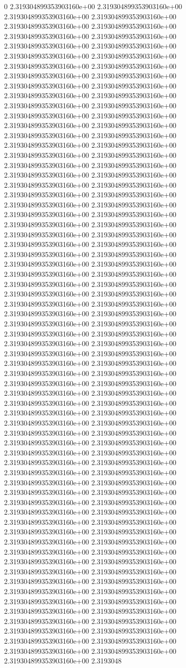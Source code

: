 0	2.319304899353903160e+00	2.319304899353903160e+00	2.319304899353903160e+00	2.319304899353903160e+00	2.319304899353903160e+00	2.319304899353903160e+00	2.319304899353903160e+00	2.319304899353903160e+00	2.319304899353903160e+00	2.319304899353903160e+00	2.319304899353903160e+00	2.319304899353903160e+00	2.319304899353903160e+00	2.319304899353903160e+00	2.319304899353903160e+00	2.319304899353903160e+00	2.319304899353903160e+00	2.319304899353903160e+00	2.319304899353903160e+00	2.319304899353903160e+00	2.319304899353903160e+00	2.319304899353903160e+00	2.319304899353903160e+00	2.319304899353903160e+00	2.319304899353903160e+00	2.319304899353903160e+00	2.319304899353903160e+00	2.319304899353903160e+00	2.319304899353903160e+00	2.319304899353903160e+00	2.319304899353903160e+00	2.319304899353903160e+00	2.319304899353903160e+00	2.319304899353903160e+00	2.319304899353903160e+00	2.319304899353903160e+00	2.319304899353903160e+00	2.319304899353903160e+00	2.319304899353903160e+00	2.319304899353903160e+00	2.319304899353903160e+00	2.319304899353903160e+00	2.319304899353903160e+00	2.319304899353903160e+00	2.319304899353903160e+00	2.319304899353903160e+00	2.319304899353903160e+00	2.319304899353903160e+00	2.319304899353903160e+00	2.319304899353903160e+00	2.319304899353903160e+00	2.319304899353903160e+00	2.319304899353903160e+00	2.319304899353903160e+00	2.319304899353903160e+00	2.319304899353903160e+00	2.319304899353903160e+00	2.319304899353903160e+00	2.319304899353903160e+00	2.319304899353903160e+00	2.319304899353903160e+00	2.319304899353903160e+00	2.319304899353903160e+00	2.319304899353903160e+00	2.319304899353903160e+00	2.319304899353903160e+00	2.319304899353903160e+00	2.319304899353903160e+00	2.319304899353903160e+00	2.319304899353903160e+00	2.319304899353903160e+00	2.319304899353903160e+00	2.319304899353903160e+00	2.319304899353903160e+00	2.319304899353903160e+00	2.319304899353903160e+00	2.319304899353903160e+00	2.319304899353903160e+00	2.319304899353903160e+00	2.319304899353903160e+00	2.319304899353903160e+00	2.319304899353903160e+00	2.319304899353903160e+00	2.319304899353903160e+00	2.319304899353903160e+00	2.319304899353903160e+00	2.319304899353903160e+00	2.319304899353903160e+00	2.319304899353903160e+00	2.319304899353903160e+00	2.319304899353903160e+00	2.319304899353903160e+00	2.319304899353903160e+00	2.319304899353903160e+00	2.319304899353903160e+00	2.319304899353903160e+00	2.319304899353903160e+00	2.319304899353903160e+00	2.319304899353903160e+00	2.319304899353903160e+00	2.319304899353903160e+00	2.319304899353903160e+00	2.319304899353903160e+00	2.319304899353903160e+00	2.319304899353903160e+00	2.319304899353903160e+00	2.319304899353903160e+00	2.319304899353903160e+00	2.319304899353903160e+00	2.319304899353903160e+00	2.319304899353903160e+00	2.319304899353903160e+00	2.319304899353903160e+00	2.319304899353903160e+00	2.319304899353903160e+00	2.319304899353903160e+00	2.319304899353903160e+00	2.319304899353903160e+00	2.319304899353903160e+00	2.319304899353903160e+00	2.319304899353903160e+00	2.319304899353903160e+00	2.319304899353903160e+00	2.319304899353903160e+00	2.319304899353903160e+00	2.319304899353903160e+00	2.319304899353903160e+00	2.319304899353903160e+00	2.319304899353903160e+00	2.319304899353903160e+00	2.319304899353903160e+00	2.319304899353903160e+00	2.319304899353903160e+00	2.3193048